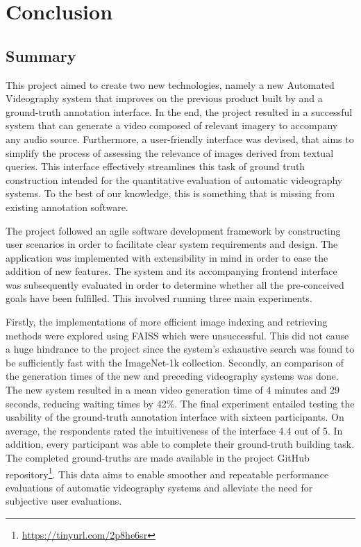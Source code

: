 \documentclass{l4proj}
\begin{document}
\chapter{Conclusion}    
\section{Summary}
This project aimed to create two new technologies, namely a new Automated Videography system that improves on the previous product built by \cite{parker} and a ground-truth annotation interface. In the end, the project resulted in a successful system that can generate a video composed of relevant imagery to accompany any audio source. Furthermore, a user-friendly interface was devised, that aims to simplify the process of assessing the relevance of images derived from textual queries. This interface effectively streamlines this task of ground truth construction intended for the quantitative evaluation of automatic videography systems. To the best of our knowledge, this is something that is missing from existing annotation software.


The project followed an agile software development framework by constructing user scenarios in order to facilitate clear system requirements and design. The application was implemented with extensibility in mind in order to ease the addition of new features. The system and its accompanying frontend interface was subsequently evaluated in order to determine whether all the pre-conceived goals have been fulfilled. This involved running three main experiments. 

Firstly, the implementations of more efficient image indexing and retrieving methods were explored using FAISS which were unsuccessful. This did not cause a huge hindrance to the project since the system's exhaustive search was found to be sufficiently fast with the ImageNet-1k collection. Secondly, an comparison of the generation times of the new and preceding videography systems was done. The new system resulted in a mean video generation time of 4 minutes and 29 seconds, reducing waiting times by 42\%. The final experiment entailed testing the usability of the ground-truth annotation interface with sixteen participants. On average, the respondents rated the intuitiveness of the interface 4.4 out of 5. In addition, every participant was able to complete their ground-truth building task. The completed ground-truths are made available in the project GitHub repository\footnote{\url{https://tinyurl.com/2p8he6sr}}. This data aims to enable smoother and repeatable performance evaluations of automatic videography systems and alleviate the need for subjective user evaluations.
\end{document}
